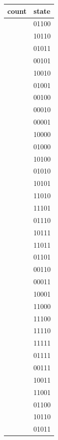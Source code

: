 \documentclass{article}
\begin{document}
\begin{center}
\begin{tabular}{c|c}
count & state \\ \hline
[22] & 01100 \\ \hline
[23] & 10110 \\ \hline
[24] & 01011 \\ \hline
[25] & 00101 \\ \hline
[26] & 10010 \\ \hline
[27] & 01001 \\ \hline
[28] & 00100 \\ \hline
[29] & 00010 \\ \hline
[30] & 00001 \\ \hline
[31] & 10000 \\ \hline
[32] & 01000 \\ \hline
[33] & 10100 \\ \hline
[34] & 01010 \\ \hline
[35] & 10101 \\ \hline
[36] & 11010 \\ \hline
[37] & 11101 \\ \hline
[38] & 01110 \\ \hline
[39] & 10111 \\ \hline
[40] & 11011 \\ \hline
[41] & 01101 \\ \hline
[42] & 00110 \\ \hline
[43] & 00011 \\ \hline
[44] & 10001 \\ \hline
[45] & 11000 \\ \hline
[46] & 11100 \\ \hline
[47] & 11110 \\ \hline
[48] & 11111 \\ \hline
[49] & 01111 \\ \hline
[50] & 00111 \\ \hline
[51] & 10011 \\ \hline
[52] & 11001 \\ \hline
[53] & 01100 \\ \hline
[54] & 10110 \\ \hline
[55] & 01011 \\ \hline
\end{tabular}
\end{center}
\end{document}
